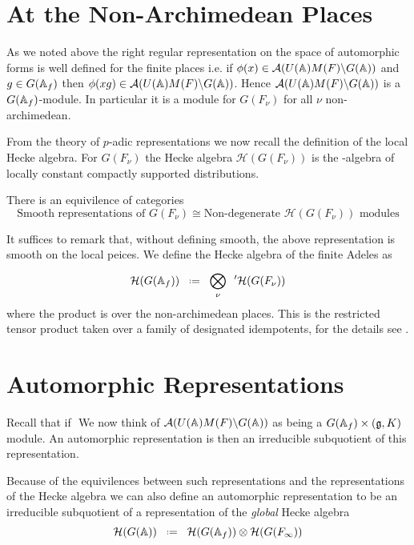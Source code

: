 \begin{Theorem}
\end{Theorem}

\section{At the Non-Archimedean Places}
As we noted above the right regular representation on the space of automorphic forms is well defined for the finite places i.e. 
if \(\phi(x)\in \mathcal{A}(U(\A)M(F)\backslash G(\A))\) and \(g\in G(\A_f)\) then \(\phi(xg) \in \mathcal{A}(U(\A)M(F)\backslash G(\A)) \). Hence \(\mathcal{A}(U(\A)M(F)\backslash G(\A))\) is a \(G(\A_f)\)-module. In particular it is a module for \(G(F_\nu)\) for all \(\nu\) non-archimedean.

From the theory of \(p\)-adic representations we now recall the definition of the local Hecke algebra. For \(G(F_\nu)\) the Hecke algebra \(\mathcal{H}(G(F_\nu))\) is the \C-algebra of locally constant compactly supported distributions. 
\begin{theorem}
    There is an equivilence of categories  
    \[\text{Smooth representations of }G(F_\nu) \cong \text{Non-degenerate }\mathcal{H}(G(F_\nu)) \text{ modules}\]
\end{theorem}
It suffices to remark that, without defining smooth, the above representation is smooth on the local peices. We define the Hecke algebra of the finite Adeles as 
\[\mathcal{H}(G(\A_f)) \defeq \bigotimes^{}_\nu \phantom{a}' \mathcal{H}(G(F_\nu))\]
where the product is over the non-archimedean places. This is the restricted tensor product taken over a family of designated idempotents, for the details see
.

\section{Automorphic Representations}
Recall that if \(\)
We now think of \(\mathcal{A}(U(\A)M(F)\backslash G(\A))\) as being a \(G(\A_f)\times (\mathfrak{g}, K)\) module. An automorphic representation is then an irreducible subquotient of this representation.

Because of the equivilences between such representations and the representations of the Hecke algebra we can also define an automorphic representation to be an irreducible subquotient of a representation of the \textit{global} Hecke algebra
\[\mathcal{H}(G(\A)) \defeq \mathcal{H}(G(\A_f)) \tensor \mathcal{H}(G(F_\infty))\]

